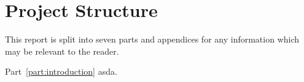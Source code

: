 \section{Project Structure}
This report is split into seven parts and appendices for any information which may be relevant to the reader.

\bigskip\noindent
Part~\ref{part:introduction} asda.
\bigskip\noindent
\bigskip\noindent
\bigskip\noindent
\bigskip\noindent
\bigskip\noindent
\bigskip\noindent

